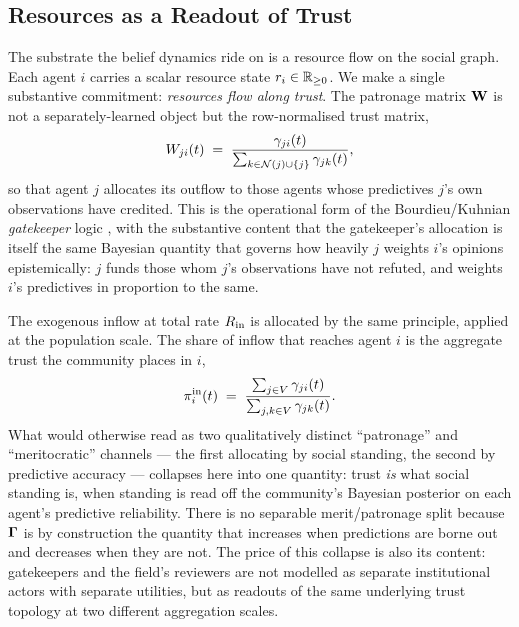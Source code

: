 \subsection{Resources as a Readout of Trust}
\label{ssec:resource}

The substrate the belief dynamics ride on is a resource flow on the
social graph. Each agent $i$ carries a scalar resource state
$r_{i} \in \mathbb{R}_{\geq 0}$. We make a single substantive
commitment: \emph{resources flow along trust}. The patronage matrix
$\mathbf{W}$ is not a separately-learned object but the row-normalised
trust matrix,
\begin{equation}
W_{ji}(t)
\;=\;
\frac{\gamma_{ji}(t)}{\sum_{k \in \mathcal{N}(j) \cup \{j\}} \gamma_{jk}(t)},
\label{eq:flow-from-trust}
\end{equation}
so that agent $j$ allocates its outflow to those agents whose
predictives $j$'s own observations have credited. This is the
operational form of the Bourdieu/Kuhnian \emph{gatekeeper} logic
\citep{bourdieu1975ScientificField}, with the substantive content that
the gatekeeper's allocation is itself the same Bayesian quantity that
governs how heavily $j$ weights $i$'s opinions epistemically: $j$ funds
those whom $j$'s observations have not refuted, and weights $i$'s
predictives in proportion to the same.

The exogenous inflow at total rate $R_{\mathrm{in}}$ is allocated by the
same principle, applied at the population scale. The share of inflow
that reaches agent $i$ is the aggregate trust the community places in
$i$,
\begin{equation}
\pi^{\mathrm{in}}_{i}(t)
\;=\;
\frac{\sum_{j \in V} \gamma_{ji}(t)}
     {\sum_{j,k \in V} \gamma_{jk}(t)}.
\label{eq:inflow-share}
\end{equation}
What would otherwise read as two qualitatively distinct
``patronage'' and ``meritocratic'' channels --- the first allocating
by social standing, the second by predictive accuracy --- collapses
here into one quantity: trust \emph{is} what social standing is, when
standing is read off the community's Bayesian posterior on each
agent's predictive reliability. There is no separable merit/patronage
split because $\boldsymbol{\Gamma}$ is by construction the quantity that
increases when predictions are borne out and decreases when they are
not. The price of this collapse is also its content: gatekeepers and
the field's reviewers are not modelled as separate institutional
actors with separate utilities, but as readouts of the same underlying
trust topology at two different aggregation scales.

